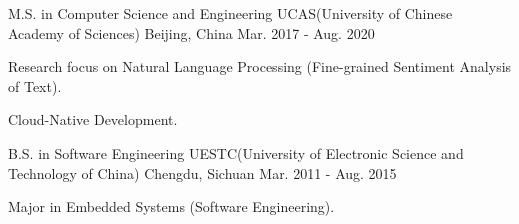 

\begin{cventries}

  \cventry
    {M.S. in Computer Science and Engineering} %
    {UCAS(University of Chinese Academy of Sciences)} %
    {Beijing, China} %
    {Mar. 2017 - Aug. 2020} %
    {
      \begin{cvitems} %
        \item {Research focus on Natural Language Processing (Fine-grained Sentiment Analysis of Text).}
        \item {Cloud-Native Development.}
      \end{cvitems}
    }

    \cventry
    {B.S. in Software Engineering} %
    {UESTC(University of Electronic Science and Technology of China)} %
    {Chengdu, Sichuan} %
    {Mar. 2011 - Aug. 2015} %
    {
      \begin{cvitems} %
        \item {Major in Embedded Systems (Software Engineering).}
      \end{cvitems}
    }

\end{cventries}
